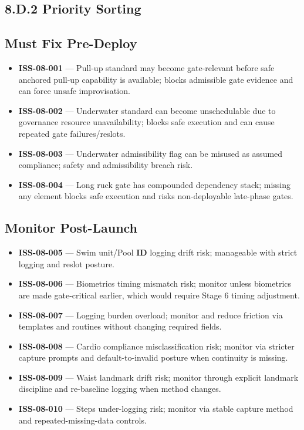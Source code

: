 \documentclass[10pt]{article}
\begin{document}
\begin{landscape}
\endgroup

\section*{8.D.2 Priority Sorting}
{}

\subsection*{Must Fix Pre-Deploy}
{}

\begin{itemize}
\item \textbf{ISS-08-001} — Pull-up standard may become gate-relevant before safe anchored pull-up capability is available; blocks admissible gate evidence and can force unsafe improvisation.
\item \textbf{ISS-08-002} — Underwater standard can become unschedulable due to governance resource unavailability; blocks safe execution and can cause repeated gate failures/reslots.
\item \textbf{ISS-08-003} — Underwater admissibility flag can be misused as assumed compliance; safety and admissibility breach risk.
\item \textbf{ISS-08-004} — Long ruck gate has compounded dependency stack; missing any element blocks safe execution and risks non-deployable late-phase gates.
\end{itemize}

\subsection*{Monitor Post-Launch}
{}

\begin{itemize}
\item \textbf{ISS-08-005} — Swim unit/Pool \textbf{ID} logging drift risk; manageable with strict logging and reslot posture.
\item \textbf{ISS-08-006} — Biometrics timing mismatch risk; monitor unless biometrics are made gate-critical earlier, which would require Stage 6 timing adjustment.
\item \textbf{ISS-08-007} — Logging burden overload; monitor and reduce friction via templates and routines without changing required fields.
\item \textbf{ISS-08-008} — Cardio compliance misclassification risk; monitor via stricter capture prompts and default-to-invalid posture when continuity is missing.
\item \textbf{ISS-08-009} — Waist landmark drift risk; monitor through explicit landmark discipline and re-baseline logging when method changes.
\item \textbf{ISS-08-010} — Steps under-logging risk; monitor via stable capture method and repeated-missing-data controls.
\end{itemize}

\end{landscape}
\end{document}
